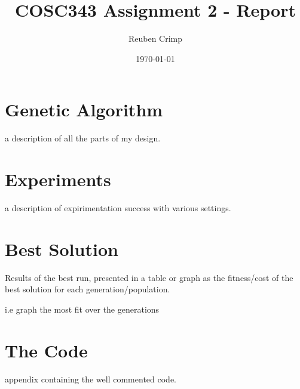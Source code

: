 \documentclass[a4paper,11pt]{article}
\title{COSC343 Assignment 2 - Report}
\author{Reuben Crimp}
\date{\today}
\begin{document}
\maketitle

\section*{Genetic Algorithm}
a description of all the parts of my design.

\section*{Experiments}
a description of expirimentation success with various settings.

\section*{Best Solution}
Results of the best run, presented in a table or graph as the fitness/cost of the best solution for each generation/population.

i.e graph the most fit over the generations

\section*{The Code}
appendix containing the well commented code.
\end{document}
